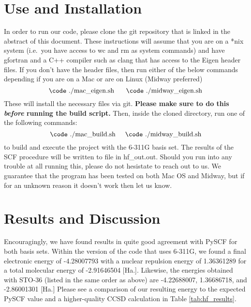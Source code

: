 \documentclass[%
 aip,
 amsmath,amssymb,
 reprint,%
]{revtex4-1}
\begin{document}
\section{Use and Installation}
In order to run our code, please clone the git repository that is linked in
the abstract of this document. These instructions will assume that you are
 on a *nix system (i.e.\ you have access to {\code wc} and {\code rm} as
 system commands) and have {\code gfortran} and a C++ compiler such as 
 {\code clang} that has access to the Eigen header files. If you don't
have the header files,  then run either of the below commands depending if you
are on a Mac or are on Linux (Midway preferred)
$$ \text{{\code ./mac\_eigen.sh} \hspace{0.5cm}{\code ./midway\_eigen.sh}}$$
These will install the necessary files via git.  \textbf{Please make sure to
do this \emph{before} running the build script.} Then, inside the cloned
directory, run one of the following commands: 
%
$$ \text{{\code ./mac\_build.sh}} \hspace{0.5cm}
 \text{{\code ./midway\_build.sh}} $$
to build and execute the project with the 6-311G basis set. The results of
the SCF procedure will be written to file in {\code hf\_out.out}. Should you
run into any trouble at all running this, please do not hesistate to
reach out to us. We guarantee that the program has been tested on both Mac OS
and Midway, but if for an unknown reason it doesn't work then let us know.

\section{Results and Discussion}
Encouragingly, we have found results in quite good agreement with PySCF for
both basis sets.  Within the version of the code that uses 6-311G,
we found a final electronic energy of  -4.28007793 with a nuclear repulsion energy
of 1.36361289   
for a total molecular energy of  -2.91646504 [Ha.]. Likewise, the energies
obtained with STO-36 (listed in the same order as above) are   -4.22688007, 
1.36686718, and -2.86001301 [Ha.]
Please see a comparison of our
resulting energy to the expected PySCF value and a higher-quality CCSD
calculation  in Table \ref{tab:hf_results}. 
\end{document}
